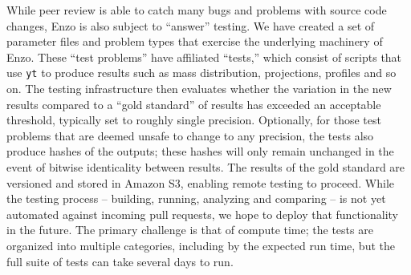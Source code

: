 While peer review is able to catch many bugs and problems with source
code changes, Enzo is also subject to ``answer'' testing.  We have created a
set of parameter files and problem types that exercise the underlying machinery
of Enzo.  These ``test problems'' have affiliated ``tests,'' which consist of
scripts that use \texttt{yt} \citep{2011ApJS..192....9T} to produce results
such as mass distribution, projections, profiles and so on.  The testing
infrastructure then evaluates whether the variation in the new results compared
to a ``gold standard'' of results has exceeded an acceptable threshold,
typically set to roughly single precision.  Optionally, for those test problems
that are deemed unsafe to change to any precision, the tests also produce
hashes of the outputs; these hashes will only remain unchanged in the event of
bitwise identicality between results.  The results of the gold standard are
versioned and stored in Amazon S3, enabling remote testing to proceed.  While
the testing process -- building, running, analyzing and comparing -- is not yet
automated against incoming pull requests, we hope to deploy that functionality
in the future.  The primary challenge is that of compute time; the tests are
organized into multiple categories, including by the expected run time, but
the full suite of tests can take several days to run.
